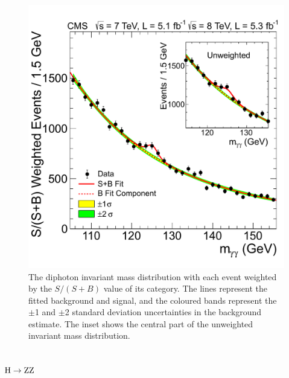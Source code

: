 \documentclass[11pt,twoside,a4paper,cmspaper,final]{cms-tdr}
\begin{document}
\begin{figure}[htbp]
   \begin{center}
     \includegraphics[width=\cmsFigWideWidth]{sbweightedmassunweightedinset1_5GeV}
     \caption{\label{fig:mass-gg} The diphoton invariant mass
       distribution with each event weighted
       by the $S/(S+B)$ value of its category. The lines
       represent the fitted background and signal, and the coloured
       bands represent the $\pm$1 and $\pm$2 standard deviation
       uncertainties in the background estimate.
       The inset shows the central part of the unweighted invariant
       mass distribution.
}
   \end{center}
\end{figure}

\subsection{\texorpdfstring{$\mathrm{H}\to\mathrm{Z}\mathrm{Z}$}{H to ZZ}\label{sec:HZZ}}
\end{document}
